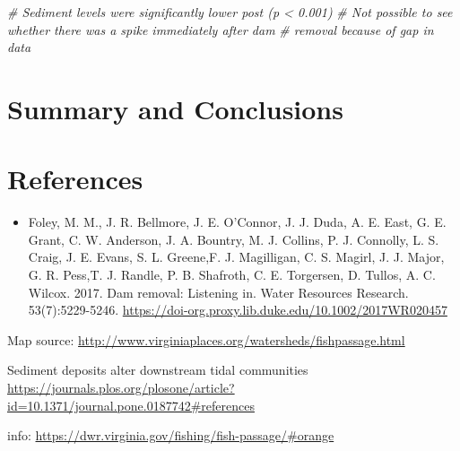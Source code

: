 \documentclass[
  12pt,
]{article}
\newenvironment{Shaded}{\begin{snugshade}}{\end{snugshade}}
\newcommand{\CommentTok}[1]{\textcolor[rgb]{0.56,0.35,0.01}{\textit{#1}}}
\providecommand{\tightlist}{%
  \setlength{\itemsep}{0pt}\setlength{\parskip}{0pt}}
\begin{document}
\begin{Shaded}
\begin{Highlighting}[]
\CommentTok{\# Sediment levels were significantly lower post (p \textless{} 0.001)}
\CommentTok{\# Not possible to see whether there was a spike immediately after dam }
\CommentTok{\# removal because of gap in data}
\end{Highlighting}
\end{Shaded}

\newpage

\hypertarget{summary-and-conclusions}{%
\section{Summary and Conclusions}\label{summary-and-conclusions}}

\newpage

\hypertarget{references}{%
\section{References}\label{references}}

\begin{itemize}
\tightlist
\item
  Foley, M. M., J. R. Bellmore, J. E. O'Connor, J. J. Duda, A. E. East,
  G. E. Grant, C. W. Anderson, J. A. Bountry, M. J. Collins, P. J.
  Connolly, L. S. Craig, J. E. Evans, S. L. Greene,F. J. Magilligan, C.
  S. Magirl, J. J. Major, G. R. Pess,T. J. Randle, P. B. Shafroth, C. E.
  Torgersen, D. Tullos, A. C. Wilcox. 2017. Dam removal: Listening in.
  Water Resources Research. 53(7):5229-5246.
  \url{https://doi-org.proxy.lib.duke.edu/10.1002/2017WR020457}
\end{itemize}

Map source:
\url{http://www.virginiaplaces.org/watersheds/fishpassage.html}

Sediment deposits alter downstream tidal communities
\url{https://journals.plos.org/plosone/article?id=10.1371/journal.pone.0187742\#references}

info: \url{https://dwr.virginia.gov/fishing/fish-passage/\#orange}
\end{document}
